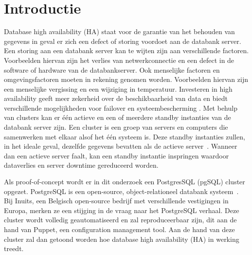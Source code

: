 
\section{Introductie} %
\label{sec:introductie}
Database high availability (HA) staat voor de garantie van het behouden van gegevens in geval er zich een defect of storing voordoet aan de databank  server. Een storing aan een databank server kan te wijten zijn aan verschillende factoren. Voorbeelden hiervan zijn het verlies van netwerkconnectie en een defect in de software of hardware van de databankserver. Ook menselijke factoren en omgevingsfactoren moeten in rekening genomen worden. Voorbeelden hiervan zijn een menselijke vergissing en een wijziging in temperatuur. Investeren in high availability geeft meer zekerheid over de beschikbaarheid van data en biedt verschillende mogelijkheden voor failover en systeembescherming \autocite{IBM1}. Met behulp van clusters kan er één actieve en een of meerdere standby instanties van de databank server zijn. Een cluster is een groep van servers en computers die samenwerken met elkaar alsof het één systeem is. Deze standby instanties zullen, in het ideale geval, dezelfde gegevens bevatten als de actieve server~\autocite{BDQ}. Wanneer dan een actieve server faalt, kan een standby instantie inspringen waardoor dataverlies en server downtime gereduceerd worden.

Als proof-of-concept wordt er in dit onderzoek een PostgresSQL (pgSQL) cluster opgezet. PostgreSQL is een open-source, object-relationeel databank systeem~\autocite{PostgreSQL2020}. Bij Inuits, een Belgisch open-source bedrijf met verschillende vestigingen in Europa, merken ze een stijging in de vraag naar het PostgreSQL verhaal. Deze cluster wordt volledig geautomatiseerd en zal reproduceerbaar zijn, dit aan de hand van Puppet, een configuration management tool. Aan de hand van deze cluster zal dan getoond worden hoe database high availability (HA) in werking treedt.



